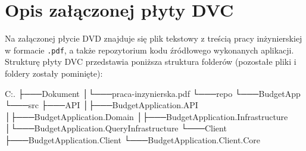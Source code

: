 \chapter{Opis załączonej płyty DVC}

Na załączonej płycie DVD znajduje się plik tekstowy z treścią pracy inżynierskiej w formacie \texttt{.pdf}, a także repozytorium kodu źródłowego wykonanych aplikacji. Strukturę płyty DVC przedstawia poniższa struktura folderów (pozostałe pliki i foldery zostały pominięte):

\null \newline

\noindent C:. \newline
├───Dokument\newline
│\quad\quad   └───praca-inzynierska.pdf\newline
└───repo\newline
    \null\quad\quad└───BudgetApp\newline
        \null\quad\quad\quad\quad└───src\newline
        \null\quad\quad\quad\quad\quad\quad   ├───API\newline
        \null\quad\quad\quad\quad\quad\quad   │\quad\quad   ├───BudgetApplication.API\newline
        \null\quad\quad\quad\quad\quad\quad   │\quad\quad   ├───BudgetApplication.Domain\newline
        \null\quad\quad\quad\quad\quad\quad   │\quad\quad   ├───BudgetApplication.Infrastructure\newline
        \null\quad\quad\quad\quad\quad\quad   │\quad\quad   └───BudgetApplication.QueryInfrastructure\newline
        \null\quad\quad\quad\quad\quad\quad   └───Client\newline
        \null\quad\quad\quad\quad\quad\quad    \quad\quad   ├───BudgetApplication.Client\newline
        \null\quad\quad\quad\quad\quad\quad    \quad\quad   └───BudgetApplication.Client.Core\newline

